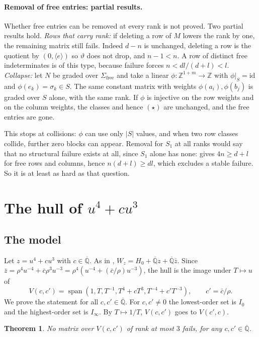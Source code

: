 \documentclass[11pt,a4paper]{article}
\theoremstyle{plain}
\newtheorem{theorem}{Theorem}
\theoremstyle{definition}
\newcommand{\Z}{\mathbb{Z}}
\newcommand{\Qbar}{\overline{\mathbb{Q}}}
\newcommand{\spn}{\operatorname{span}}
\newcommand{\vth}{\vartheta}
\newcommand{\Iz}{I_{0}}
\newcommand{\Ii}{I_{\infty}}
\newcommand{\free}{\mathrm{free}}
\begin{document}
\paragraph{Removal of free entries: partial results.} Whether free entries can be removed at every rank is not proved. Two partial results hold. \emph{Rows that carry rank:} if deleting a row of $M$ lowers the rank by one, the remaining matrix still fails. Indeed $d-n$ is unchanged, deleting a row is the quotient by $(0,\langle e\rangle)$ so $\vth$ does not drop, and $n-1<n$. A row of distinct free indeterminates is of this type, because failure forces $n<dl/(d+l)<l$. \emph{Collapse:} let $N$ be graded over $\Sigma_{\free}$ and take a linear $\phi:\Z^{1+m}\to\Z$ with $\phi|_{S}=\mathrm{id}$ and $\phi(e_{k})=\sigma_{k}\in S$. The same constant matrix with weights $\phi(a_{i}),\phi(b_{j})$ is graded over $S$ alone, with the same rank. If $\phi$ is injective on the row weights and on the column weights, the classes and hence $(\star)$ are unchanged, and the free entries are gone.

This stops at collisions: $\phi$ can use only $|S|$ values, and when two row classes collide, further zero blocks can appear. Removal for $S_{1}$ at all ranks would say that no structural failure exists at all, since $S_{1}$ alone has none: \cite[Th.~3.4]{Roy95} gives $4n\ge d+l$ for free rows and columns, hence $n(d+l)\ge dl$, which excludes a stable failure. So it is at least as hard as that question.

\section{The hull of $u^{4}+cu^{3}$}\label{sec:hull}

\subsection{The model}

Let $z=u^{4}+cu^{3}$ with $c\in\Qbar$. As in \cite{TC}, $W_{z}=H_{0}+\Qbar z+\Qbar\bar z$. Since $\bar z=\rho^{4}u^{-4}+\bar c\rho^{3}u^{-3}=\rho^{4}(u^{-4}+(\bar c/\rho)u^{-3})$, the hull is the image under $T\mapsto u$ of
\[
  V(c,c')=\spn(1,T,T^{-1},T^{4}+cT^{3},T^{-4}+c'T^{-3}),\qquad c'=\bar c/\rho .
\]
We prove the statement for all $c,c'\in\Qbar$. For $c,c'\neq0$ the lowest-order set is $\Iz$ and the highest-order set is $\Ii$. By $T\mapsto1/T$, $V(c,c')$ goes to $V(c',c)$.

\begin{theorem}\label{thm:hull}
No matrix over $V(c,c')$ of rank at most $3$ fails, for any $c,c'\in\Qbar$.
\end{theorem}
\end{document}
